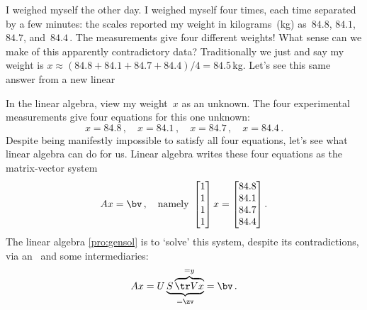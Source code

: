 \begin{example} \label{eg:fourwts}
I weighed myself the other day. 
I weighed myself four times, each time separated by a few minutes:  the scales reported my weight in kilograms~(kg) as~\(84.8\), \(84.1\), \(84.7\), and~\(84.4\)\,.
The measurements give four different weights!
What sense can we make of this apparently contradictory data?
Traditionally we just  and say my weight is \(x\approx (84.8+84.1+84.7+84.4)/4=84.5\)\,kg.
Let's see this same answer from a new linear 

In the linear algebra, view my weight~\(x\) as an unknown.
The four experimental measurements give four equations for this one unknown:
\begin{equation*}
x=84.8\,,\quad
x=84.1\,,\quad
x=84.7\,,\quad
x=84.4\,.
\end{equation*}
Despite being manifestly impossible to satisfy all four equations, let's see what linear algebra can do for us.
Linear algebra writes these four equations as the matrix-vector system
\begin{equation*}
Ax=\bv\,,\quad\text{namely }
\begin{bmatrix} 1\\1\\1\\1 \end{bmatrix}x
=\begin{bmatrix} 84.8\\84.1\\84.7\\84.4 \end{bmatrix}.
\end{equation*}
The linear algebra \cref{pro:gensol} is to `solve' this system, despite its contradictions, via an \svd\ and some intermediaries:
\begin{equation*}
Ax=U\underbrace{S\overbrace{\tr Vx}^{=y}}_{=\zv}=\bv\,.
\end{equation*}


\end{example}
